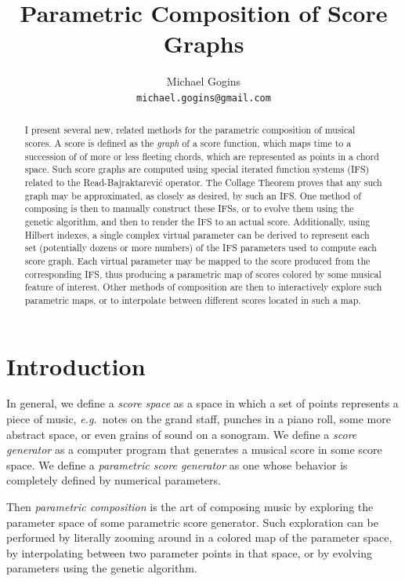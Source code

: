 \documentclass[english,11pt,letterpaper,onecolumn]{scrartcl}
\numberwithin{equation}{section}
\begin{document}
\title{Parametric Composition of Score Graphs}
\author{Michael Gogins \\ \texttt{michael.gogins@gmail.com}}
\maketitle

\begin{abstract}
I present several new, related methods for the parametric composition of musical
scores. A score is defined as the \textit{graph} of a score function, which maps
time to a succession of of more or less fleeting chords, which are represented
as  points in a chord space.  Such score graphs are computed using special
iterated function systems (IFS) related to the Read-Bajraktarevi\'c operator.
The Collage Theorem proves that any such graph may be approximated, as closely
as desired, by such an IFS. One method of composing is then to manually
construct these IFSs, or to evolve them using the genetic algorithm, and then to
render the IFS to an actual score. Additionally, using Hilbert indexes, a single
complex virtual parameter can be derived to represent each set (potentially
dozens or more numbers) of the IFS parameters used to compute each score graph.
Each virtual parameter may be mapped to the score produced from the
corresponding IFS, thus producing a parametric map of scores colored by some
musical feature of interest. Other methods of composition are then to
interactively explore such parametric maps, or to interpolate between different
scores located in such a map.
\end{abstract}


\section{Introduction}

In general, we define a \textit{score space} as a space in which a set of points
represents a piece of music, \textit{e.g.}\ notes on the grand staff, punches in
a piano roll, some more abstract space, or even grains of sound on a sonogram.
We define a \textit{score generator} as a computer program that generates a
musical score in some score space. We define a \textit{parametric score
generator} as one whose behavior is completely defined by numerical parameters.

Then \textit{parametric composition} is the art of composing music by exploring
the parameter space of some parametric score generator. Such exploration can be
performed by literally zooming around in a colored map of the parameter space,
by interpolating between two parameter points in that space, or by evolving
parameters using the genetic algorithm.
\end{document}
